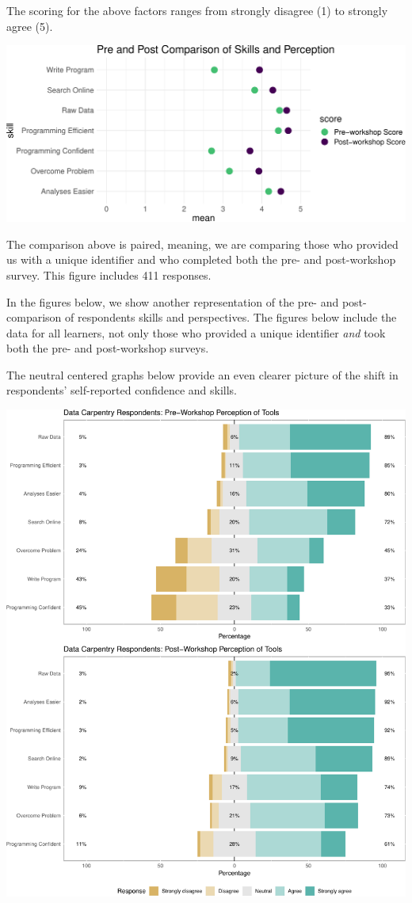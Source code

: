 \documentclass[]{article}
\makeatletter
\def\maxwidth{\ifdim\Gin@nat@width>\linewidth\linewidth\else\Gin@nat@width\fi}
\makeatother
\begin{document}
The scoring for the above factors ranges from strongly disagree (1) to
strongly agree (5).

\includegraphics[width=\maxwidth]{../figures/dc-paired-data-mean-1}

The comparison above is paired, meaning, we are comparing those who
provided us with a unique identifier and who completed both the pre- and
post-workshop survey. This figure includes 411 responses.

In the figures below, we show another representation of the pre- and
post-comparison of respondents skills and perspectives. The figures
below include the data for all learners, not only those who provided a
unique identifier \emph{and} took both the pre- and post-workshop
surveys.

The neutral centered graphs below provide an even clearer picture of the
shift in respondents' self-reported confidence and skills.

\includegraphics[width=\maxwidth]{../figures/dc-tools-perception-1}
\end{document}
